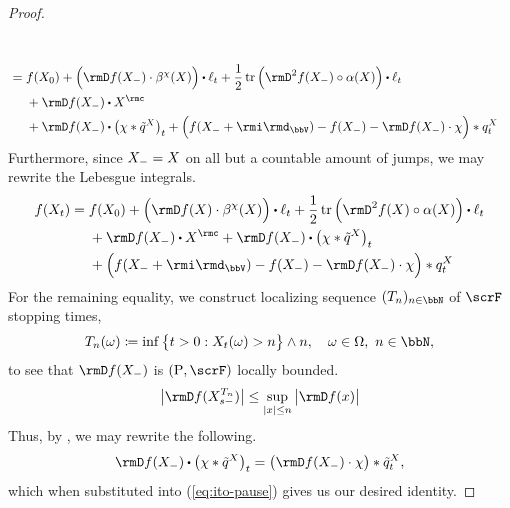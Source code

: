 \begin{proof}
\begin{align*}
\begin{aligned}[t]
    \end{aligned} \\[1em]
    &= \begin{aligned}[t]
      &f(\X_0) 
      + \Big( \Der f(\X_-) \cdot \affDrift^\trunc(\X) \Big) \shortInt \leb_t + \frac12 \tr\Big( \Hess f(\X_-) \circ \affDiff(\X) \Big)  \shortInt \leb_t \\
      &+ \Der f(\X_-) \shortInt \X^\rmc \\
      &+ \Der f(\X_-) \shortInt \big( \trunc \ast \compensate{\jumpMeas^\X} \big)_t 
      + \Big( f(\X_-+\id_\vecSpace) - f(\X_-) - \Der f(\X_-) \cdot \trunc \Big) \ast \jumpMeas^\X_t
    \end{aligned}
  \end{align*}
  Furthermore, since $X_- = X$ on all but a countable amount of jumps, we may rewrite the Lebesgue integrals.
  \begin{equation}
    \label{eq:ito-pause}
    f(\X_t)
    = \begin{aligned}[t]
      &f(\X_0) 
      + \Big( \Der f(\X) \cdot \affDrift^\trunc(\X) \Big) \shortInt \leb_t 
      + \frac12 \tr\Big( \Hess f(\X) \circ \affDiff(\X) \Big)  \shortInt \leb_t \\
      &+ \Der f(\X_-) \shortInt \X^\rmc 
      + \Der f(\X_-) \shortInt \big( \trunc \ast \compensate{\jumpMeas^\X} \big)_t \\
      &+ \Big( f(\X_-+\id_\vecSpace) - f(\X_-) - \Der f(\X_-) \cdot \trunc \Big) \ast \jumpMeas^\X_t
    \end{aligned}
  \end{equation}
  For the remaining equality, we construct localizing sequence $(T_n)_{n\in\bbN}$ of $\scrF$ stopping times,
  \begin{equation}
    \label{eq:stopping-times}
    T_n(\omega) \defeq \inf \big\{ t > 0 : \X_t(\omega) > n \big\} \wedge n, \quad \omega \in \Omega, ~ n \in \bbN,
  \end{equation}
  to see that $\Der f(\X_-)$ is $(\Prb, \scrF)$ locally bounded.
  \begin{equation*}
    \big|\Der f(\X^{T_n}_{s-})\big| \leq \sup_{|\stateVar| \leq n} \big| \Der f(\stateVar) \big|
  \end{equation*}
  Thus, by \cite[Proposition II.1.30]{jacod2003}, we may rewrite the following.
  \begin{equation*}
    \Der f(\X_-) \shortInt \big( \trunc \ast \compensate{\jumpMeas^\X} \big)_t 
    = \big( \Der f(\X_-) \cdot \trunc \big) \ast \compensate{\jumpMeas^\X}_t ,
  \end{equation*}
  which when substituted into (\ref{eq:ito-pause}) gives us our desired identity.
\end{proof}

